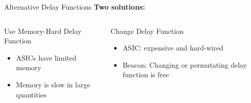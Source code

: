 \begin{frame}{Alternative Delay Functions}
    \centering
    \textbf{Two solutions:}

    \vspace{.5cm}

    \begin{columns}[T, onlytextwidth]
        \begin{block}{Use Memory-Hard Delay Function}
            \begin{itemize}
                \item ASICs have limited memory
                \item Memory is slow in large quantities
            \end{itemize}
        \end{block}

        \begin{block}{Change Delay Function}
            \begin{itemize}
                \item ASIC: expensive and hard-wired
                \item Beacon: Changing or permutating delay function is free
            \end{itemize}
        \end{block}
    \end{columns}
\end{frame}

